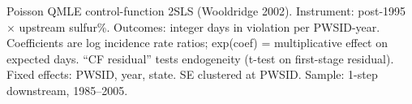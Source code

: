 \par \raggedright 
Poisson QMLE control-function 2SLS (Wooldridge 2002). Instrument: post-1995 $\times$ upstream sulfur\%. Outcomes: integer days in violation per PWSID-year. Coefficients are log incidence rate ratios; exp(coef) = multiplicative effect on expected days. ``CF residual'' tests endogeneity (t-test on first-stage residual). Fixed effects: PWSID, year, state. SE clustered at PWSID. Sample: 1-step downstream, 1985--2005.
\par\endgroup


